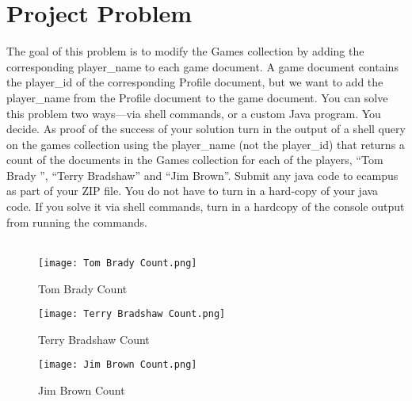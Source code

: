 \documentclass [letter,12pt] {article}
\begin{document}
\section{Project Problem}
    The goal of this problem is to modify the Games collection by adding
    the corresponding player\_name to each game document. A game document
    contains the player\_id of the corresponding Profile document, but we
    want to add the player\_name from the Profile document to the game
    document. You can solve this problem two ways—via shell commands, or 
    a custom Java program. You decide. As proof of the success of your 
    solution turn in the output of a shell query on the games collection 
    using the player\_name (not the player\_id) that returns a count of the 
    documents in the Games collection for each of the players, “Tom Brady ”, 
    “Terry Bradshaw” and “Jim Brown”. Submit any java code to ecampus as 
    part of your ZIP file. You do not have to turn in a hard-copy of your 
    java code. If you solve it via shell commands, turn in a hardcopy of 
    the console output from running the commands.
    \\
    \\
    \begin{figure}[htp]
    \centering
    \texttt{[image: Tom Brady Count.png]}
    \caption{Tom Brady Count}
    \label{fig:bradycount}
    \end{figure}
    
    \begin{figure}[htp]
    \centering
    \texttt{[image: Terry Bradshaw Count.png]}
    \caption{Terry Bradshaw Count}
    \label{fig:bradshawcount}
    \end{figure}
    
    \begin{figure}[htp]
    \centering
    \texttt{[image: Jim Brown Count.png]}
    \caption{Jim Brown Count}
    \label{fig:jimcount}
    \end{figure}
\end{document}
